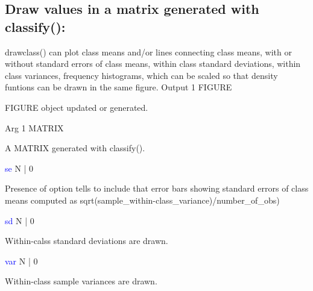 \subsection{Draw values in a matrix generated with \textcolor{VioletRed}{classify}(): \textc}
\label{drawclass}
\textcolor{VioletRed}{drawclass}() can plot class means and/or lines connecting class means, with
or without standard errors of class means, within class standard deviations,
within class variances, frequency histograms, which can be scaled so that
density funtions can be drawn in the same figure.
\vspace{0.3cm}
\hline
\vspace{0.3cm}
\noindent Output  \tabto{3cm} 1  \tabto{5cm}   FIGURE  \tabto{7cm}
\begin{changemargin}{3cm}{0cm}
\noindent  FIGURE object updated or generated.
\end{changemargin}
\vspace{0.3cm}
\hline
\vspace{0.3cm}
\noindent Arg  \tabto{3cm}  1 \tabto{5cm}   MATRIX  \tabto{7cm}
\begin{changemargin}{3cm}{0cm}
\noindent  A MATRIX generated with \textcolor{VioletRed}{classify}().
\end{changemargin}
\vspace{0.3cm}
\hline
\vspace{0.3cm}
\noindent \textcolor{blue}{se}  \tabto{3cm}  N | 0  \tabto{5cm}    \tabto{7cm}
\begin{changemargin}{3cm}{0cm}
\noindent Presence of option tells to include that error bars showing standard errors
of class means computed as \textcolor{VioletRed}{sqrt}(sample\_within-class\_variance)/number\_of\_obs)
\end{changemargin}
\vspace{0.3cm}
\hline
\vspace{0.3cm}
\noindent \textcolor{blue}{sd}  \tabto{3cm}  N | 0  \tabto{5cm}    \tabto{7cm}
\begin{changemargin}{3cm}{0cm}
\noindent  Within-calss standard deviations are drawn.
\end{changemargin}
\vspace{0.3cm}
\hline
\vspace{0.3cm}
\noindent \textcolor{blue}{var}  \tabto{3cm}  N | 0  \tabto{5cm}     \tabto{7cm}
\begin{changemargin}{3cm}{0cm}
\noindent Within-class sample variances are drawn.
\end{changemargin}
